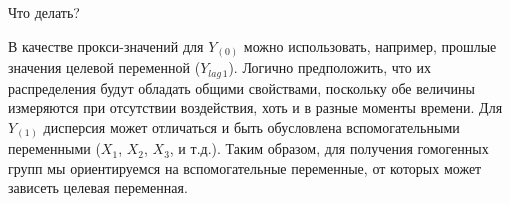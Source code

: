 %

        Что делать?

        В качестве прокси-значений для $Y_{(0)}$ можно использовать, например, прошлые значения целевой переменной ($Y_{lag \, 1}$).
        Логично предположить, что их распределения будут обладать общими свойствами, поскольку обе величины измеряются при отсутствии воздействия, хоть и в разные моменты времени.
        Для $Y_{(1)}$ дисперсия может отличаться и быть обусловлена вспомогательными переменными ($X_1$, $X_2$, $X_3$, и т.д.).
        Таким образом, для получения гомогенных групп мы ориентируемся на вспомогательные переменные, от которых может зависеть целевая переменная.

%



%
%

